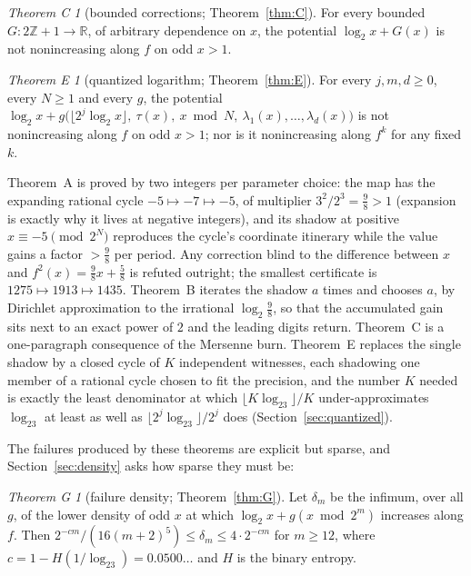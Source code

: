 \documentclass[11pt]{article}
\theoremstyle{definition}
\theoremstyle{remark}
\newtheorem*{thmC}{Theorem C}
\newtheorem*{thmE}{Theorem E}
\newtheorem*{thmG}{Theorem G}
\newcommand{\Z}{\mathbb{Z}}
\newcommand{\R}{\mathbb{R}}
\begin{document}
\begin{thmC}[bounded corrections; Theorem~\ref{thm:C}]
For every bounded $G:2\Z+1\to\R$, of arbitrary dependence on $x$, the
potential $\log_2x+G(x)$ is not nonincreasing along $f$ on odd $x>1$.
\end{thmC}

\begin{thmE}[quantized logarithm; Theorem~\ref{thm:E}]
For every $j,m,d\ge0$, every $N\ge1$ and every $g$, the potential
$\log_2x+g\bigl(\lfloor2^{j}\log_2x\rfloor,\ \tau(x),\ x\bmod N,\
\lambda_1(x),\dots,\lambda_d(x)\bigr)$ is not nonincreasing along $f$
on odd $x>1$; nor is it nonincreasing along $f^{k}$ for any fixed $k$.
\end{thmE}

Theorem~A is proved by two integers per parameter choice: the map has
the expanding rational cycle $-5\mapsto-7\mapsto-5$, of multiplier
$3^2/2^3=\tfrac98>1$ (expansion is exactly why it lives at negative
integers), and its shadow at positive $x\equiv-5\pmod{2^N}$ reproduces
the cycle's coordinate itinerary while the value gains a factor
$>\tfrac98$ per period. Any correction blind to the difference between
$x$ and $f^2(x)=\tfrac98x+\tfrac58$ is refuted outright; the smallest
certificate is $1275\mapsto1913\mapsto1435$. Theorem~B iterates the
shadow $a$ times and chooses $a$, by Dirichlet approximation to the
irrational $\log_2\tfrac98$, so that the accumulated gain sits next to
an exact power of $2$ and the leading digits return. Theorem~C is a
one-paragraph consequence of the Mersenne burn. Theorem~E replaces the
single shadow by a closed cycle of $K$ independent witnesses, each
shadowing one member of a rational cycle chosen to fit the precision,
and the number $K$ needed is exactly the least denominator at which
$\lfloor K\log_23\rfloor/K$ under-approximates $\log_23$ at least as
well as $\lfloor2^{j}\log_23\rfloor/2^{j}$ does (Section~\ref{sec:quantized}).

The failures produced by these theorems are explicit but sparse, and
Section~\ref{sec:density} asks how sparse they must be:

\begin{thmG}[failure density; Theorem~\ref{thm:G}]
Let $\delta_m$ be the infimum, over all $g$, of the lower density of odd
$x$ at which $\log_2x+g(x\bmod2^{m})$ increases along $f$. Then
$2^{-cm}/(16(m+2)^{5})\le\delta_m\le4\cdot2^{-cm}$ for $m\ge12$, where
$c=1-H(1/\log_23)=0.0500\ldots$ and $H$ is the binary entropy.
\end{thmG}
\end{document}
